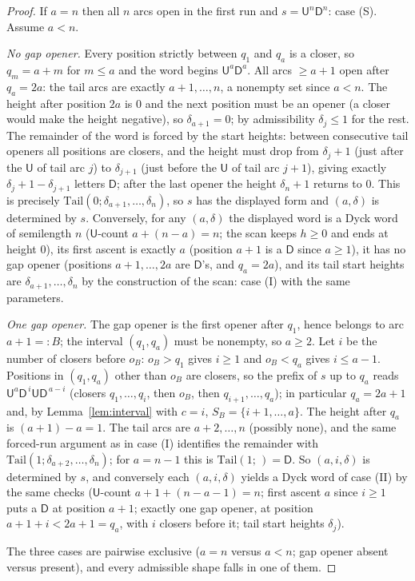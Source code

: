 \documentclass[11pt]{article}
\theoremstyle{definition}
\theoremstyle{remark}
\newcommand{\sU}{\mathsf{U}}
\newcommand{\sD}{\mathsf{D}}
\begin{document}
\begin{proof}
If $a=n$ then all $n$ arcs open in the first run and $s=\sU^n\sD^n$: case
(S). Assume $a<n$.

\emph{No gap opener.} Every position strictly between $q_1$ and $q_a$ is a
closer, so $q_m=a+m$ for $m\le a$ and the word begins $\sU^a\sD^a$. All
arcs $\ge a+1$ open after $q_a=2a$: the tail arcs are exactly
$a+1,\dots,n$, a nonempty set since $a<n$. The height after position $2a$
is $0$ and the next position must be an opener (a closer would make the
height negative), so $\delta_{a+1}=0$; by admissibility $\delta_j\le1$ for
the rest. The remainder of the word is forced by the start heights:
between consecutive tail openers all positions are closers, and the height
must drop from $\delta_j+1$ (just after the $\sU$ of tail arc $j$) to
$\delta_{j+1}$ (just before the $\sU$ of tail arc $j+1$), giving exactly
$\delta_j+1-\delta_{j+1}$ letters $\sD$; after the last opener the height
$\delta_n+1$ returns to $0$. This is precisely
$\mathrm{Tail}(0;\delta_{a+1},\dots,\delta_n)$, so $s$ has the displayed
form and $(a,\delta)$ is determined by $s$. Conversely, for any
$(a,\delta)$ the displayed word is a Dyck word of semilength $n$
($\sU$-count $a+(n-a)=n$; the scan keeps $h\ge0$ and ends at height $0$),
its first ascent is exactly $a$ (position $a+1$ is a $\sD$ since $a\ge1$),
it has no gap opener (positions $a+1,\dots,2a$ are $\sD$'s, and $q_a=2a$),
and its tail start heights are $\delta_{a+1},\dots,\delta_n$ by the
construction of the scan: case (I) with the same parameters.

\emph{One gap opener.} The gap opener is the first opener after $q_1$,
hence belongs to arc $a+1=:B$; the interval $(q_1,q_a)$ must be nonempty,
so $a\ge2$. Let $i$ be the number of closers before $o_B$: $o_B>q_1$ gives
$i\ge1$ and $o_B<q_a$ gives $i\le a-1$. Positions in $(q_1,q_a)$ other than
$o_B$ are closers, so the prefix of $s$ up to $q_a$ reads
$\sU^a\sD^{\,i}\sU\sD^{\,a-i}$ (closers $q_1,\dots,q_i$, then $o_B$, then
$q_{i+1},\dots,q_a$); in particular $q_a=2a+1$ and, by
Lemma~\ref{lem:interval} with $c=i$, $S_B=\{i+1,\dots,a\}$. The height
after $q_a$ is $(a+1)-a=1$. The tail arcs are $a+2,\dots,n$ (possibly
none), and the same forced-run argument as in case (I) identifies the
remainder with $\mathrm{Tail}(1;\delta_{a+2},\dots,\delta_n)$; for $a=n-1$
this is $\mathrm{Tail}(1;\,)=\sD$. So $(a,i,\delta)$ is determined by $s$,
and conversely each $(a,i,\delta)$ yields a Dyck word of case (II) by the
same checks ($\sU$-count $a+1+(n-a-1)=n$; first ascent $a$ since $i\ge1$
puts a $\sD$ at position $a+1$; exactly one gap opener, at position
$a+1+i<2a+1=q_a$, with $i$ closers before it; tail start heights
$\delta_j$).

The three cases are pairwise exclusive ($a=n$ versus $a<n$; gap opener
absent versus present), and every admissible shape falls in one of them.
\end{proof}
\end{document}
